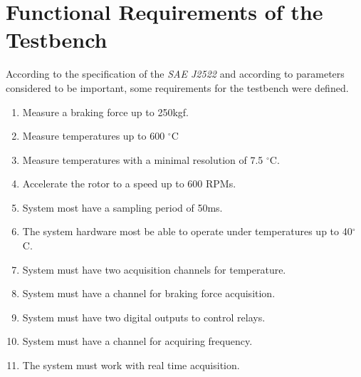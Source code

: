\section{Functional Requirements of the Testbench}\label{sec:functionalRequirements}

	According to the specification of the \textit{SAE J2522} and according to parameters considered to be important, some requirements for the testbench were defined.

	\begin{enumerate}
		\item Measure a braking force up to 250kgf.\label{itm:func-req-1}
		\begin{comment}
		\item Apply a braking pressure of at least 300 kPa.\label{itm:func-req-2}
		\end{comment}
		\item Measure temperatures up to 600 $^{\circ}$C\label{itm:func-req-3}
		\item Measure temperatures with a minimal resolution of 7.5 $^{\circ}$C.\label{itm:func-req-4}
		\item Accelerate the rotor to a speed up to 600 RPMs.\label{itm:func-req-5}
		\item System most have a sampling period of 50ms.\label{itm:func-req-6}
		\item The system hardware most be able to operate under temperatures up to 40$^{\circ}$C.\label{itm:func-req-7}
		\item System must have two acquisition channels for temperature.\label{itm:func-req-8}
		\item System must have a channel for braking force acquisition.\label{itm:func-req-9}
		\begin{comment}
		\item System must have a channel for vibration acquisition.\label{itm:func-req-10}
		\end{comment}
		\item System must have two digital outputs to control relays.\label{itm:func-req-11}
		\item System must have a channel for acquiring frequency.\label{itm:func-req-12}
		\item The system must work with real time acquisition.\label{itm:func-req-13}
		\begin{comment}
		\item The system must be able to detect when the sensors from the acquisition channels are disconnected.\label{itm:func-req-14}
		\end{comment}
	\end{enumerate}

